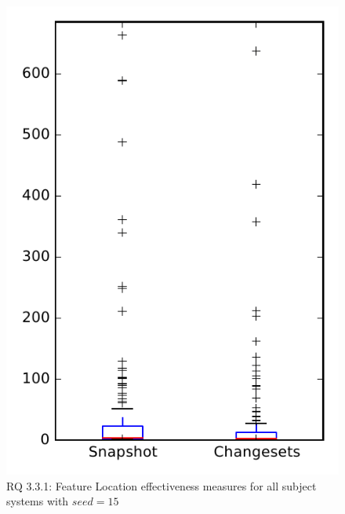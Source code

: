 
\begin{figure}
\centering
\includegraphics[height=0.4\textheight]{figures/flt_seed/rq1_overview_15}
\caption{RQ 3.3.1: Feature Location effectiveness measures for all subject systems with $seed=15$}
\label{fig:flt_seed:rq1:overview}
\end{figure}
